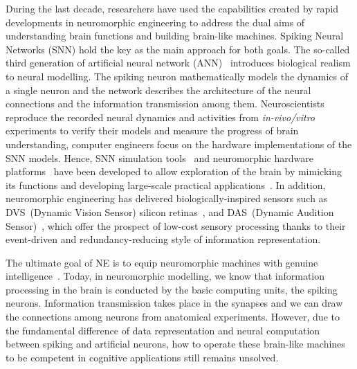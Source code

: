 During the last decade, researchers have used the capabilities created by rapid developments in neuromorphic engineering to address the dual aims of understanding brain functions and building brain-like machines.
Spiking Neural Networks (SNN) hold the key as the main approach for both goals.
The so-called third generation of artificial neural network (ANN)~\citep{maass1997networks} introduces biological realism to neural modelling.
The spiking neuron mathematically models the dynamics of a single neuron and the network describes the architecture of the neural connections and the information transmission among them.
Neuroscientists reproduce the recorded neural dynamics and activities from \textit{in-vivo/vitro} experiments to verify their models and measure the progress of brain understanding, \protect{} \protect{} computer engineers focus on the hardware implementations of the SNN models.
Hence, SNN simulation tools~\citep{davison2008pynn, gewaltig2007nest, goodman2008brian} and neuromorphic hardware platforms~\citep{furber2014spinnaker,  schemmel2010wafer,benjamin2014neurogrid,merolla2014million} have been developed to allow exploration of the brain by mimicking its functions and developing large-scale practical applications~\citep{eliasmith2012large}.
In addition, neuromorphic engineering has delivered biologically-inspired sensors such as DVS~(Dynamic Vision Sensor) silicon retinas~\citep{serrano2013128, delbruck2008frame, yang2015dynamic, posch2014retinomorphic}, and DAS~(Dynamic Audition Sensor)~\citep{5537164}, which offer the prospect of low-cost sensory processing thanks to their event-driven and redundancy-reducing style of information representation.

The \protect{} ultimate goal of NE is to equip neuromorphic machines with genuine intelligence~\citep{konar1999artificial}.
Today, in neuromorphic \protect{} modelling, we know that information processing in the brain is conducted by the basic computing units, the spiking neurons.
Information transmission takes place in the synapses and we can draw the connections among neurons from anatomical experiments.
\protect{}
However, due to the fundamental difference of data representation and neural computation between spiking and artificial neurons, \protect{} how to operate these brain-like machines to be competent in cognitive applications still remains unsolved.

